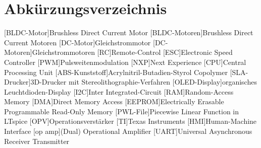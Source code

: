 

\pagestyle {fancy}
\rhead{\thepage} \chead{} 
\cfoot{}

\section*{Abkürzungsverzeichnis}

\begin{acronym}
	[BLDC-Motor]{Brushless Direct Current Motor}
	[BLDC-Motoren]{Brushless Direct Current Motoren}
	[DC-Motor]{Gleich\-strom\-motor}
	[DC-Motoren]{Gleich\-strom\-motoren}
	[RC]{Remote-Control}
	[ESC]{Electronic Speed Controller}
	[PWM]{Puls\-weiten\-modulation}
	[NXP]{Next Experience}
	[CPU]{Central Processing Unit}
	[ABS-Kunststoff]{Acrylnitril-Butadien-Styrol Copolymer}
	[SLA-Drucker]{3D-Drucker mit Stereolithographie-Verfahren}
	[OLED-Display]{organisches Leuchtdioden-Display}
	[I2C]{Inter Integrated-Circuit}
	[RAM]{Random-Access Memory}
	[DMA]{Direct Memory Access}
	[EEPROM]{Electrically Erasable Programmable Read-Only Memory}
	[PWL-File]{Piecewise Linear Function in LTspice}
	[OPV]{Operationsverstärker}
	[TI]{Texas Instruments}
	[HMI]{Human-Machine Interface}
	[op amp]{(Dual) Operational Amplifier}
	[UART]{Universal Asynchronous Receiver Transmitter}
\end{acronym}

\newpage
